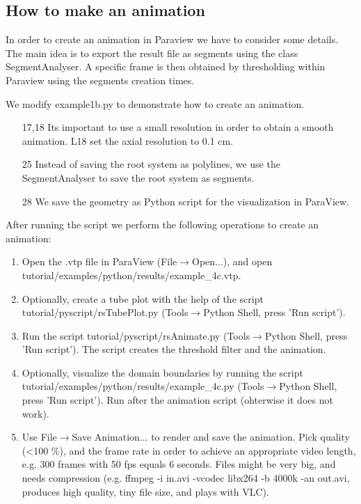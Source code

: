 \subsection{How to make an animation}

In order to create an animation in Paraview we have to consider some details. The main idea is to export the result file as segments using the class SegmentAnalyser. A specific frame is then obtained by thresholding within Paraview using the segments creation times. 

We modify example1b.py to demonstrate how to create an animation.

% 

\begin{itemize}

\item[17,18] Its important to use a small resolution in order to obtain a smooth animation. L18 set the axial resolution to 0.1 cm. 

\item[25] Instead of saving the root system as polylines, we use the SegmentAnalyser to save the root system as segments.

\item[28] We save the geometry as Python script for the visualization in ParaView.

\end{itemize}

After running the script we perform the following operations to create an animation:
\begin{enumerate}
 \item Open the .vtp file in ParaView (File$\rightarrow$Open...), and open tutorial/examples/python/results/example\_4c.vtp.
 \item Optionally, create a tube plot with the help of the script tutorial/pyscript/rsTubePlot.py (Tools$\rightarrow$Python Shell, press 'Run script').
 \item Run the script tutorial/pyscript/rsAnimate.py (Tools$\rightarrow$Python Shell, press 'Run script'). The script creates the threshold filter and the animation. 
 \item Optionally, visualize the domain boundaries by running the script tutorial/examples/python/results/example\_4c.py (Tools$\rightarrow$Python Shell, press 'Run script'). Run after the animation script (ohterwise it does not work).  
 \item Use File$\rightarrow$Save Animation... to render and save the animation. Pick quality (<100 \%), and the frame rate in order to achieve an appropriate video length, e.g. 300 frames with 50 fps equals 6 seconds. Files might be very big, and needs compression (e.g. ffmpeg -i in.avi -vcodec libx264 -b 4000k -an out.avi, produces high quality, tiny file size, and plays with VLC).
\end{enumerate}




